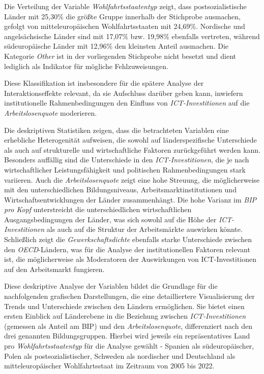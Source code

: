 

Die Verteilung der Variable \textit{Wohlfahrtsstaatentyp} zeigt, dass postsozialistische 
Länder mit 25,30\% die größte Gruppe innerhalb der Stichprobe ausmachen, gefolgt von 
mitteleuropäischen Wohlfahrtsstaaten mit 24,69\%. Nordische und angelsächsische 
Länder sind mit 17,07\% bzw. 19,98\% ebenfalls vertreten, während südeuropäische 
Länder mit 12,96\% den kleinsten Anteil ausmachen. Die Kategorie \textit{Other} ist 
in der vorliegenden Stichprobe nicht besetzt und dient lediglich als Indikator für mögliche 
Fehlzuweisungen.

Diese Klassifikation ist insbesondere für die spätere Analyse der Interaktionseffekte 
relevant, da sie Aufschluss darüber geben kann, inwiefern institutionelle 
Rahmenbedingungen den Einfluss von \textit{\ac{ICT}-Investitionen} auf die 
\textit{Arbeitslosenquote} moderieren.

Die deskriptiven Statistiken zeigen, dass die betrachteten Variablen eine erhebliche 
Heterogenität aufweisen, die sowohl auf länderspezifische Unterschiede als auch auf 
strukturelle und wirtschaftliche Faktoren zurückgeführt werden kann. Besonders auffällig 
sind die Unterschiede in den \textit{\ac{ICT}-Investitionen}, die je nach wirtschaftlicher 
Leistungsfähigkeit und politischen Rahmenbedingungen stark variieren. Auch die 
\textit{Arbeitslosenquote} zeigt eine hohe Streuung, die möglicherweise mit den 
unterschiedlichen Bildungsniveaus, Arbeitsmarktinstitutionen und Wirtschaftsentwicklungen 
der Länder zusammenhängt. Die hohe Varianz im \textit{\ac{BIP} pro Kopf} unterstreicht die 
unterschiedlichen wirtschaftlichen Ausgangsbedingungen der Länder, was sich sowohl auf die 
Höhe der \textit{\ac{ICT}-Investitionen} als auch auf die Struktur der Arbeitsmärkte 
auswirken könnte. Schließlich zeigt die \textit{Gewerkschaftsdichte} ebenfalls starke 
Unterschiede zwischen den \textit{OECD}-Ländern, was für die Analyse der institutionellen 
Faktoren relevant ist, die möglicherweise als Moderatoren der Auswirkungen von 
\ac{ICT}-Investitionen auf den Arbeitsmarkt fungieren.

Diese deskriptive Analyse der Variablen bildet die Grundlage für die nachfolgenden 
grafischen Darstellungen, die eine detailliertere Visualisierung der Trends und Unterschiede 
zwischen den Ländern ermöglichen. Sie bietet einen ersten Einblick auf Länderebene in die 
Beziehung zwischen \textit{\ac{ICT}-Investitionen} (gemessen als Anteil am \ac{BIP}) und 
den \textit{Arbeitslosenquote}, differenziert nach den drei genannten Bildungsgruppen. 
Hierbei wird jeweils ein repräsentatives Land pro \textit{Wohlfahrtsstaatentyp} für die 
Analyse gewählt - Spanien als südeuropäischer, Polen als postsozialistischer, Schweden als 
nordischer und Deutschland als mitteleuropäischer Wohlfahrtsstaat im Zeitraum von 2005 bis 2022. 

